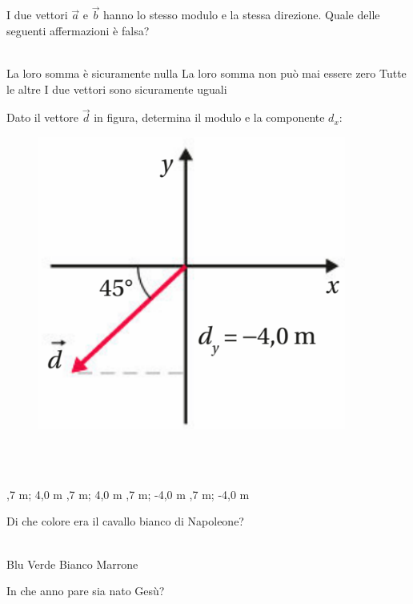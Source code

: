 \documentclass[a4paper,11pt]{exam}
\begin{document}
\begin{questions}
    
\question I due vettori $\vec{a}$ e $\vec{b}$ hanno lo stesso modulo e la stessa direzione. Quale delle seguenti affermazioni è falsa?\\\
\begin{oneparchoices}
  \choice La loro somma è sicuramente nulla
  \choice La loro somma non può mai essere zero
  \choice Tutte le altre
  \choice I due vettori sono sicuramente uguali
\end{oneparchoices}

    
\question Dato il vettore $\vec{d}$ in figura, determina il modulo e la componente $d_x$: \begin{figure}[h!]   \begin{center}     \includegraphics[scale=0.35]{vettored.png}   \end{center} \end{figure}\\\
\begin{oneparchoices}
  ,7 m; 4,0 m
  ,7 m; 4,0 m
  \choice 5,7 m; -4,0 m
  \choice -5,7 m; -4,0 m
\end{oneparchoices}

    
\question Di che colore era il cavallo bianco di Napoleone?\\\
\begin{oneparchoices}
  \choice Blu 
  \choice Verde
  \choice Bianco
  \choice Marrone
\end{oneparchoices}

    
\question In che anno pare sia nato Gesù?\\\
\begin{oneparchoices}
  \choice 0
  \choice 2019
  \choice 20
\end{oneparchoices}


\end{questions}
\end{document}
